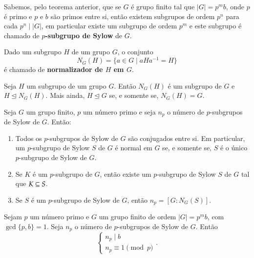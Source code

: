 \begin{definicao}
Sabemos, pelo teorema anterior, que se $G$ {\'e} grupo finito tal que $|G| =
p^m b$, onde $p$ {\'e} primo e $p$ e $b$ s{\~a}o primos entre si, ent{\~a}o
existem subgrupos de ordem $p^n$ para cada $p^n \mid |G|$, em particular
existe um subgrupo de ordem $p^m$ e este subgrupo {\'e} chamado de
\textbf{$p$-subgrupo de Sylow} de $G$.
\end{definicao}

\begin{definicao}
	Dado um subgrupo $H$ de um grupo $G$, o conjunto
	\[
		N_G(H) = \{a \in G \mid aHa^{-1} = H\}
	\]
	\'e chamado de \textbf{normalizador de $H$ em $G$}.
\end{definicao}

\begin{proposicao}
	Seja $H$ um subgrupo de um grupo $G$. Ent\~ao $N_G(H)$ \'e um subgrupo de $G$ e $H \unlhd N_G(H)$. Mais ainda, $H \unlhd G$ se, e somente se, $N_G(H) = G$.
\end{proposicao}

\begin{teorema}
	Seja $G$ um grupo finito, $p$ um n\'umero primo e seja $n_p$ o n\'umero de $p$-subgrupos de Sylow de $G$. Ent\~ao:
	\begin{enumerate}
		\item Todos os $p$-subgrupos de Sylow de $G$ s\~ao conjugados entre si. Em particular, um $p$-subgrupo de Sylow $S$ de $G$ \'e normal em $G$ se, e somente se, $S$ \'e o \'unico $p$-subgrupo de Sylow de $G$.

		\item Se $K$ \'e um $p$-subgrupo de $G$, ent\~ao existe um $p$-subgrupo de Sylow $S$ de $G$ tal que $K \subseteq S$.

		\item Se $S$ \'e um $p$-subgrupo de Sylow de $G$, ent\~ao $n_p = [G : N_G(S)]$.
	\end{enumerate}
\end{teorema}

\begin{teorema}
	Sejam $p$ um n\'umero primo e $G$ um grupo finito de ordem $|G| = p^mb$, com $\gcd\{p, b\} = 1$. Seja $n_p$ o n\'umero de $p$-subgrupos de Sylow de $G$. Ent\~ao
	\[
		\begin{cases}
			n_p \mid b\\
			n_p \equiv 1 \pmod p
		\end{cases}.
	\]
\end{teorema}

